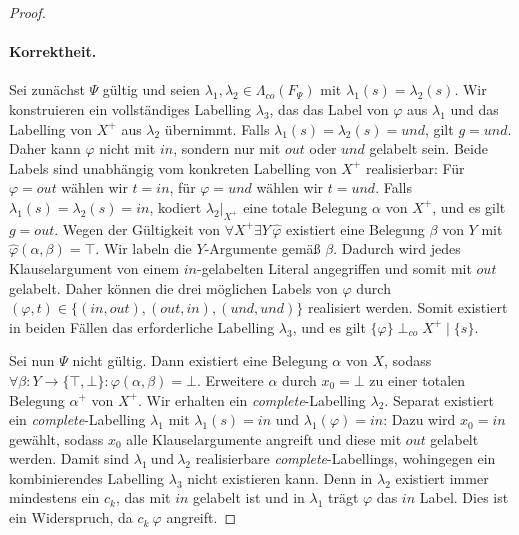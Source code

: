 \begin{proof}
    \paragraph{Korrektheit.}
    Sei zunächst \(\Psi\) gültig und seien
    \(\lambda_1,\lambda_2\in\Lambda_{co}(F_{\Psi})\) mit
    \(\lambda_1(s)=\lambda_2(s)\). Wir konstruieren ein vollständiges
    Labelling \(\lambda_3\), das das Label von \(\varphi\) aus
    \(\lambda_1\) und das Labelling von \(X^{+}\) aus \(\lambda_2\)
    übernimmt.
    Falls \(\lambda_1(s)=\lambda_2(s)=und\), gilt \(g=und\).
    Daher kann \(\varphi\) nicht mit \(in\), sondern nur mit \(out\)
    oder \(und\) gelabelt sein. Beide Labels sind unabhängig vom
    konkreten Labelling von \(X^{+}\) realisierbar: Für
    \(\varphi=out\) wählen wir \(t=in\), für \(\varphi=und\) wählen
    wir \(t=und\).
    Falls \(\lambda_1(s)=\lambda_2(s)=in\), kodiert
    \(\lambda_2|_{X^{+}}\) eine totale Belegung \(\alpha\) von
    \(X^{+}\), und es gilt \(g=out\). Wegen der Gültigkeit von
    \(\forall X^{+}\exists Y\,\widehat{\varphi}\) existiert eine
    Belegung \(\beta\) von \(Y\) mit
    \(\widehat{\varphi}(\alpha,\beta)=\top\). Wir labeln die
    \(Y\)-Argumente gemäß \(\beta\). Dadurch wird jedes
    Klauselargument von einem \(in\)-gelabelten Literal angegriffen
    und somit mit \(out\) gelabelt. Daher können die drei möglichen
    Labels von \(\varphi\) durch
    \(
        (\varphi,t)\in
        \{(in,out),(out,in),(und,und)\}
    \)
    realisiert werden. Somit existiert in beiden Fällen das
    erforderliche Labelling \(\lambda_3\), und es gilt
    \(\{\varphi\}\perp_{co}X^{+}\mid\{s\}\).

    Sei nun \(\Psi\) nicht gültig. Dann existiert eine Belegung
    \(\alpha\) von \(X\), sodass
    \(
        \forall\beta:Y\to\{\top,\bot\}\colon
        \varphi(\alpha,\beta)=\bot.
    \)
    Erweitere \(\alpha\) durch \(x_0=\bot\) zu einer totalen Belegung
    \(\alpha^{+}\) von \(X^{+}\). Wir erhalten ein \emph{complete}-Labelling \(\lambda_2\).
    Separat existiert ein \emph{complete}-Labelling \(\lambda_1\) mit
    \(\lambda_1(s)=in\) und \(\lambda_1(\varphi)=in\): Dazu wird
    \(x_0=in\) gewählt, sodass \(x_0\) alle Klauselargumente angreift
    und diese mit \(out\) gelabelt werden.
    Damit sind \(\lambda_1~\text{und}~\lambda_2\) realisierbare \emph{complete}-Labellings, wohingegen ein 
    kombinierendes Labelling \(\lambda_3\) nicht existieren kann. Denn in \(\lambda_2\) existiert immer mindestens ein
    \(c_k\), das mit \(in\) gelabelt ist und in \(\lambda_1\) trägt \(\varphi\) das \(in\) Label. Dies ist ein Widerspruch, da 
    \(c_k ~\varphi\) angreift. 

\end{proof}
